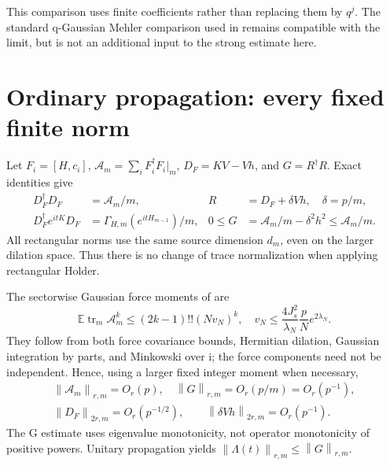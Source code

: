 \documentclass[11pt]{article}
\newcommand{\E}{\mathbb E}
\newcommand{\tr}{\operatorname{tr}}
\newcommand{\norm}[1]{\left\lVert#1\right\rVert}
\begin{document}
This comparison uses finite coefficients rather than replacing
them by $q^j$. The standard q-Gaussian Mehler comparison used
in \cite{background,bks} remains compatible with the limit,
but is not an additional input to the strong estimate here.

\newpage
\section{Ordinary propagation: every fixed finite norm}
Let $F_i=[H,c_i]$, $\mathcal A_m=\sum_iF_i^\dagger F_i|_m$,
$D_F=KV-Vh$, and $G=R^\dagger R$. Exact identities give
\begin{align}
 D_F^\dagger D_F&=\mathcal A_m/m,&
 R&=D_F+\delta Vh,\quad\delta=p/m,\nonumber\\
 D_F^\dagger e^{itK}D_F&=\Gamma_{H,m}(e^{itH_{m-1}})/m,&
 0\le G&=\mathcal A_m/m-\delta^2h^2\le\mathcal A_m/m.
 \label{dilation}
\end{align}
All rectangular norms use the same source dimension $d_m$,
even on the larger dilation space. Thus there is no change of
trace normalization when applying rectangular Holder.

The sectorwise Gaussian force moments of \cite{return} are
\begin{equation}\label{force-mom}
 \E\tr_m\mathcal A_m^k\le(2k-1)!!(Nv_N)^k,
 \quad v_N\le\frac{4J_s^2}{\lambda_N}\frac pN e^{2\lambda_N}.
\end{equation}
They follow from both force covariance bounds, Hermitian
dilation, Gaussian integration by parts, and Minkowski over i;
the force components need not be independent. Hence, using a
larger fixed integer moment when necessary,
\begin{gather}
 \norm{\mathcal A_m}_{r,m}=O_r(p),\quad
 \norm G_{r,m}=O_r(p/m)=O_r(p^{-1}),\label{Gbnd}\\
 \norm{D_F}_{2r,m}=O_r(p^{-1/2}),\qquad
 \norm{\delta Vh}_{2r,m}=O_r(p^{-1}).\label{DFbnd}
\end{gather}
The G estimate uses eigenvalue monotonicity, not operator
monotonicity of positive powers. Unitary propagation yields
$\norm{\Lambda(t)}_{r,m}\le\norm G_{r,m}$.
\end{document}
